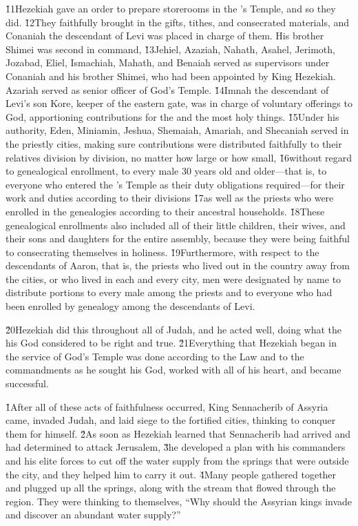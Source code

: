 \v{11}Hezekiah gave an order to prepare storerooms in the 's Temple, and so they did. \v{12}They faithfully brought in the gifts, tithes, and consecrated materials, and Conaniah the descendant of Levi was placed in charge of them. His brother Shimei was second in command, \v{13}Jehiel, Azaziah, Nahath, Asahel, Jerimoth, Jozabad, Eliel, Ismachiah, Mahath, and Benaiah served as supervisors under Conaniah and his brother Shimei, who had been appointed by King Hezekiah. Azariah served as senior officer of God's Temple. \v{14}Imnah the descendant of Levi's son Kore, keeper of the eastern gate, was in charge of voluntary offerings to God, apportioning contributions for the  and the most holy things. \v{15}Under his authority, Eden, Miniamin, Jeshua, Shemaiah, Amariah, and Shecaniah served in the priestly cities, making sure contributions were distributed faithfully to their relatives division by division, no matter how large or how small, \v{16}without regard to genealogical enrollment, to every male 30 years old and older---that is, to everyone who entered the 's Temple as their duty obligations required---for their work and duties according to their divisions \v{17}as well as the priests who were enrolled in the genealogies according to their ancestral households. \v{18}These genealogical enrollments also included all of their little children, their wives, and their sons and daughters for the entire assembly, because they were being faithful to consecrating themselves in holiness. \v{19}Furthermore, with respect to the descendants of Aaron, that is, the priests who lived out in the country away from the cities, or who lived in each and every city, men were designated by name to distribute portions to every male among the priests and to everyone who had been enrolled by genealogy among the descendants of Levi.

\v{20}Hezekiah did this throughout all of Judah, and he acted well, doing what the  his God considered to be right and true. \v{21}Everything that Hezekiah began in the service of God's Temple was done according to the Law and to the commandments as he sought his God, worked with all of his heart, and became successful.

\v{1}After all of these acts of faithfulness occurred, King Sennacherib of Assyria came, invaded Judah, and laid siege to the fortified cities, thinking to conquer them for himself. \v{2}As soon as Hezekiah learned that Sennacherib had arrived and had determined to attack Jerusalem, \v{3}he developed a plan with his commanders and his elite forces to cut off the water supply from the springs that were outside the city, and they helped him to carry it out. \v{4}Many people gathered together and plugged up all the springs, along with the stream that flowed through the region. They were thinking to themselves, ``Why should the Assyrian kings invade and discover an abundant water supply?''

